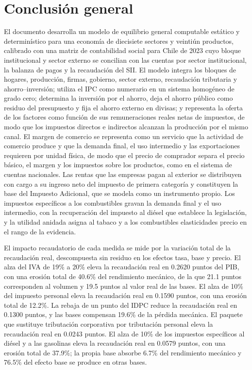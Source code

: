 \documentclass[11pt]{article}
\begin{document}
\section{Conclusión general}
\label{sec:conclusion}

El documento desarrolla un modelo de equilibrio general computable estático y determinístico para una economía de diecisiete sectores y veintiún productos, calibrado con una matriz de contabilidad social para Chile de 2023 cuyo bloque institucional y sector externo se concilian con las cuentas por sector institucional, la balanza de pagos y la recaudación del SII. El modelo integra los bloques de hogares, producción, firmas, gobierno, sector externo, recaudación tributaria y ahorro--inversión; utiliza el IPC como numerario en un sistema homogéneo de grado cero; determina la inversión por el ahorro, deja el ahorro público como residuo del presupuesto y fija el ahorro externo en divisas; y representa la oferta de los factores como función de sus remuneraciones reales netas de impuestos, de modo que los impuestos directos e indirectos alcanzan la producción por el mismo canal. El margen de comercio se representa como un servicio que la actividad de comercio produce y que la demanda final, el uso intermedio y las exportaciones requieren por unidad física, de modo que el precio de comprador separa el precio básico, el margen y los impuestos sobre los productos, como en el sistema de cuentas nacionales. Las rentas que las empresas pagan al exterior se distribuyen con cargo a su ingreso neto del impuesto de primera categoría y constituyen la base del Impuesto Adicional, que se modela como un instrumento propio. Los impuestos específicos a los combustibles gravan la demanda final y el uso intermedio, con la recuperación del impuesto al diésel que establece la legislación, y la utilidad anidada asigna al tabaco y a los combustibles elasticidades precio en el rango de la evidencia.

El impacto recaudatorio de cada medida se mide por la variación total de la recaudación real, descompuesta sin residuo en los efectos tasa, base y precio. El alza del IVA de 19\% a 20\% eleva la recaudación real en 0.2620 puntos del PIB, con una erosión total de 40.6\% del rendimiento mecánico, de la que 21.1 puntos corresponden al volumen y 19.5 puntos al valor real de las bases. El alza de 10\% del impuesto personal eleva la recaudación real en 0.1590 puntos, con una erosión total de 12.2\%. La rebaja de un punto del IDPC reduce la recaudación real en 0.1300 puntos, y las bases compensan 19.6\% de la pérdida mecánica. El paquete que sustituye tributación corporativa por tributación personal eleva la recaudación real en 0.0243 puntos. El alza de 10\% de los impuestos específicos al diésel y a las gasolinas eleva la recaudación real en 0.0579 puntos, con una erosión total de 37.9\%; la propia base absorbe 6.7\% del rendimiento mecánico y 76.5\% del efecto base se produce en otras bases.
\end{document}
